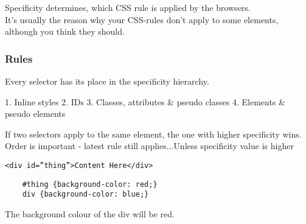 Specificity determines, which CSS rule is applied by the browsers.
\\

It’s usually the reason why your CSS-rules don’t apply to some elements, although you think they should.

\subsubsection{Rules}

Every selector has its place in the specificity hierarchy.

1. Inline styles
2. IDs
3. Classes, attributes \& pseudo classes
4. Elements \& pseudo elements

If two selectors apply to the same element, the one with higher specificity wins.
\\

Order is important - latest rule still applies...Unless specificity value is higher

\begin{verbatim}
<div id=”thing”>Content Here</div>
\end{verbatim}

\begin{verbatim}
    #thing {background-color: red;}
    div {background-color: blue;}
\end{verbatim}

The background colour of the div will be red.


